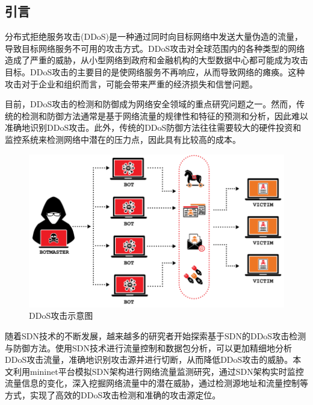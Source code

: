 \begin{multicols}{2} 
\section{引言}\label{chpt:1}%
分布式拒绝服务攻击(DDoS)是一种通过同时向目标网络中发送大量伪造的流量，导致目标网络服务不可用的攻击方式。DDoS攻击对全球范围内的各种类型的网络造成了严重的威胁，从小型网络到政府和金融机构的大型数据中心都可能成为攻击目标。DDoS攻击的主要目的是使网络服务不再响应，从而导致网络的瘫痪。这种攻击对于企业和组织而言，可能会带来严重的经济损失和信誉问题。

目前，DDoS攻击的检测和防御成为网络安全领域的重点研究问题之一。然而，传统的检测和防御方法通常是基于网络流量的规律性和特征的预测和分析，因此难以准确地识别DDoS攻击。此外，传统的DDoS防御方法往往需要较大的硬件投资和监控系统来检测网络中潜在的压力点，因此具有比较高的成本。

\begin{figure}[H]
	\centering
	\includegraphics[width=0.95\linewidth]{pics/ddos2.png}
	\caption{DDoS攻击示意图}
	\label{fig:1}
\end{figure}

随着SDN技术的不断发展，越来越多的研究者开始探索基于SDN的DDoS攻击检测与防御方法。使用SDN技术进行流量控制和数据包分析，可以更加精细地分析DDoS攻击流量，准确地识别攻击源并进行切断，从而降低DDoS攻击的威胁。本文利用mininet平台模拟SDN架构进行网络流量监测研究，通过SDN架构实时监控流量信息的变化，深入挖掘网络流量中的潜在威胁，通过检测源地址和流量控制等方式，实现了高效的DDoS攻击检测和准确的攻击源定位。

%
%


\end{multicols}
